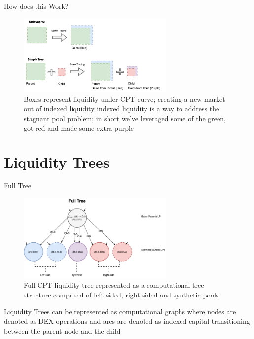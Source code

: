 \documentclass[10pt,xcolor=svgnames]{beamer} %
\begin{document}
\begin{frame}{How does this Work?} 

\begin{figure}[h!]
\includegraphics[width=3in]{img/compare.png}
\caption{Boxes represent liquidity under CPT curve; creating a new market out of indexed liquidity indexed liquidity is a way to address the stagnant pool problem; in short we've leveraged some of the green, got red and made some extra purple} 
\label{fig:compare}
\end{figure}

\end{frame}



\section{Liquidity Trees}

\begin{frame}{Full Tree} 

\begin{figure}[h!]
\includegraphics[width=3in]{img/full_tree.png}
\caption{Full CPT liquidity tree represented as a computational tree structure comprised of left-sided, right-sided and synthetic pools } 
\label{fig:full_tree}
\end{figure}

Liquidity Trees can be represented as computational graphs where nodes are denoted as DEX operations and arcs are denoted as indexed capital transitioning between the parent node and the child

\end{frame}
\end{document}
